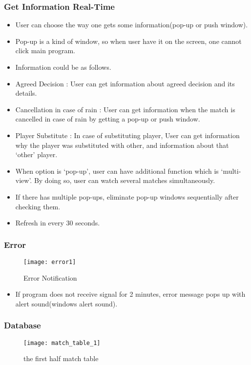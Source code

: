 \documentclass[conference,compsoc, twocolumn]{IEEEtran}
\begin{document}
\subsubsection{Get Information Real-Time}
\begin{itemize}
\item User can choose the way one gets some information(pop-up or push window).
\item Pop-up is a kind of window, so when user have it on the screen, one cannot click main program.
\item Information could be as follows.
\item Agreed Decision : User can get information about agreed decision and its details.
\item Cancellation in case of rain : User can get information when the match is cancelled in case of rain by getting a pop-up or push window.
\item Player Substitute : In case of substituting player, User can get information why the player was substituted with other, and information about that ‘other’  player.
\item When option is ‘pop-up’, user can have additional function which is ‘multi-view’.  By doing so, user can watch several matches simultaneously.
\item If there has multiple pop-ups, eliminate pop-up windows sequentially after checking them.
\item Refresh in every 30 seconds.
\end{itemize}



\subsubsection{Error}
\begin{figure}[h]
\centering\texttt{[image: error1]}
\caption{Error Notification}
\end{figure}

\begin{itemize}
\item  If program does not receive signal for 2 minutes, error message pops up with alert sound(windows alert sound).
\end{itemize}

\subsubsection{Database}
\begin{figure}[h]
\centering\texttt{[image: match\_table\_1]}
\caption{the first half match table}
\end{figure}
\end{document}
